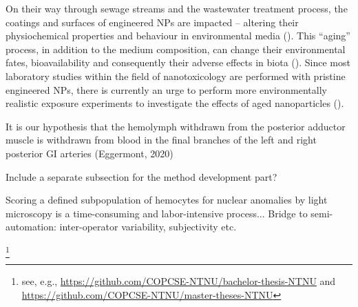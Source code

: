 On their way through sewage streams and the wastewater treatment process, the coatings and surfaces of engineered NPs are impacted – altering their physiochemical properties and behaviour in environmental media (\cite{Kaegi2013}). This “aging” process, in addition to the medium composition, can change their environmental fates, bioavailability and consequently their adverse effects in biota (\cite{Metreveli2016, Georgantzopoulou2020}). Since most laboratory studies within the field of nanotoxicology are performed with pristine engineered NPs, there is currently an urge to perform more environmentally realistic exposure experiments to investigate the effects of aged nanoparticles (\cite{Metreveli2016}).



It is our hypothesis that the hemolymph withdrawn from the posterior adductor muscle is withdrawn from blood in the final branches of the left and right posterior GI arteries (Eggermont, 2020)



Include a separate subsection for the method development part?

Scoring a defined subpopulation of hemocytes for nuclear anomalies by light microscopy is a time-consuming and labor-intensive process... Bridge to semi-automation: inter-operator variability, subjectivity etc.




\footnote{see, e.g., 
\url{https://github.com/COPCSE-NTNU/bachelor-thesis-NTNU} and \url{https://github.com/COPCSE-NTNU/master-theses-NTNU}}
